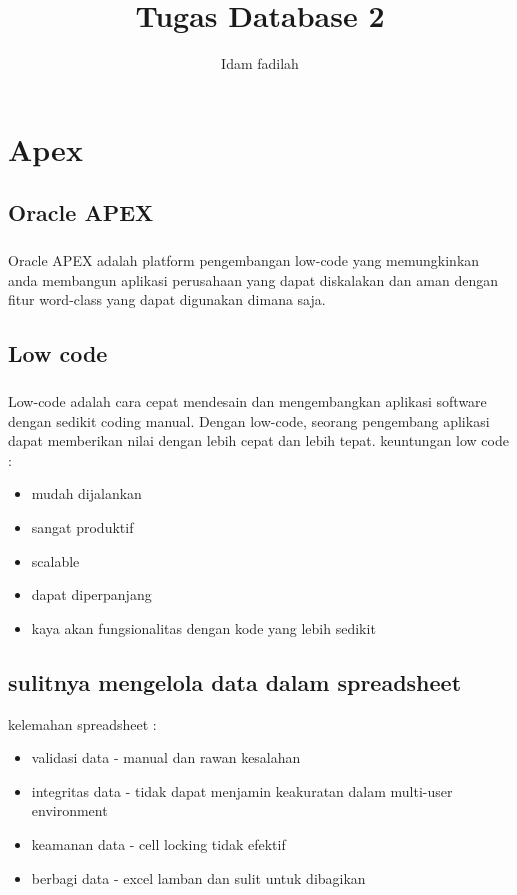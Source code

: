\documentclass[a4paper,12pt]{report}
\title{Tugas Database 2}
\author{Idam fadilah}
\begin{document}
\maketitle
\chapter{Apex}
\section*{Oracle APEX}
\paragraph{}
Oracle APEX adalah platform pengembangan low-code yang memungkinkan anda membangun aplikasi perusahaan yang dapat diskalakan dan aman dengan fitur word-class yang dapat digunakan dimana saja.
\section*{Low code}
\paragraph{}
Low-code adalah cara cepat mendesain dan mengembangkan aplikasi software dengan sedikit coding manual. Dengan low-code, seorang pengembang aplikasi dapat memberikan nilai dengan lebih cepat dan lebih tepat. keuntungan low code :
\begin{itemize}
	\item mudah dijalankan
	\item sangat produktif
	\item scalable
	\item dapat diperpanjang
	\item kaya akan fungsionalitas dengan kode yang lebih sedikit
\end{itemize}
\section{sulitnya mengelola data dalam spreadsheet}
 kelemahan spreadsheet :
\begin{itemize}
	\item validasi data - manual dan rawan kesalahan
	\item integritas data - tidak dapat menjamin keakuratan dalam multi-user environment
	\item keamanan data - cell locking tidak efektif
	\item berbagi data - excel lamban dan sulit untuk dibagikan
\end{itemize}
\end{document}
